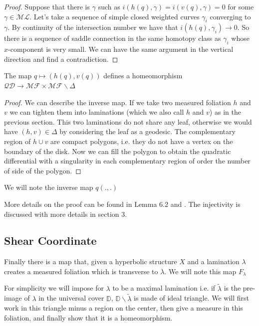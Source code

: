 \begin{proof}
Suppose that there is $\gamma$ such as $i(h(q),\gamma)=i(v(q),\gamma)=0$ for some $\gamma \in \mathcal{ML}$. Let's take a sequence of simple closed weighted curves $\gamma_i$ converging to $\gamma$. By continuity of the intersection number we have that $i(h(q),\gamma_i) \to 0$. So there is a sequence of saddle connection in the same homotopy class as $\gamma_i$ whose $x$-component is very small. We can have the same argument in the vertical direction and find a contradiction.
\end{proof}

\begin{thm}
The map $q \mapsto (h(q),v(q))$ defines a homeomorphism $\mathcal{QD} \to \mathcal{MF} \times \mathcal{MF} \backslash \Delta$
\end{thm}

\begin{proof}
We can describe the inverse map. If we take two measured foliation $h$ and $v$ we can tighten them into laminations (which we also call $h$ and $v$) as in the previous section. This two laminations do not share any leaf, otherwise we would have $(h,v) \in \Delta$ by considering the leaf as a geodesic.
The complementary region of $h \cup v$ are compact polygons, i.e. they do not have a vertex on the boundary of the disk.
Now we can fill the polygon to obtain the quadratic differential with a singularity in each complementary region of order the number of side of the polygon.
\end{proof}

We will note the inverse map $q(.,.)$


More details on the proof can be found in \cite{casson_bleiler_1988} Lemma 6.2 and \cite{QuadHub}. The injectivity is discussed with more details in \cite{Gardiner-1991} section 3.

\subsection{Shear Coordinate}

Finally there is a map that, given a hyperbolic structure $X$ and a lamination $\lambda$ creates a measured foliation which is transverse to $\lambda$. We will note this map $F_\lambda$

For simplicity we will impose for $\lambda$ to be a maximal lamination i.e. if $\tilde{\lambda}$ is the pre-image of $\lambda$ in the universal cover $\mathbb{D}$, $\mathbb{D}\backslash \tilde{\lambda}$ is made of ideal triangle. We will first work in this triangle minus a region on the center, then give a measure in this foliation, and finally show that it is a homeomorphism.

